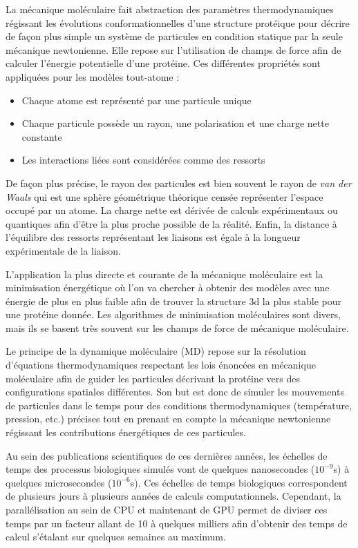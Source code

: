 
La mécanique moléculaire fait abstraction des paramètres thermodynamiques régissant les évolutions conformationnelles d'une structure protéique pour décrire de façon plus simple un système de particules en condition statique par la seule mécanique newtonienne. Elle repose sur l'utilisation de champs de force afin de calculer l'énergie potentielle d'une protéine. Ces différentes propriétés sont appliquées pour les modèles tout-atome :

\begin{itemize}
  \item Chaque atome est représenté par une particule unique
  \item Chaque particule possède un rayon, une polarisation et une charge nette constante
  \item Les interactions liées sont considérées comme des ressorts 
\end{itemize}

De façon plus précise, le rayon des particules est bien souvent le rayon de \textit{van der Waals} qui est une sphère géométrique théorique censée représenter l'espace occupé par un atome. La charge nette est dérivée de calculs expérimentaux ou quantiques afin d'être la plus proche possible de la réalité. Enfin, la distance à l'équilibre des ressorts représentant les liaisons est égale à la longueur expérimentale de la liaison.

L'application la plus directe et courante de la mécanique moléculaire est la minimisation énergétique où l'on va chercher à obtenir des modèles avec une énergie de plus en plus faible afin de trouver la structure 3d la plus stable pour une protéine donnée. Les algorithmes de minimisation moléculaires sont divers, mais ils se basent très souvent sur les champs de force de mécanique moléculaire.


Le principe de la dynamique moléculaire (MD) repose sur la résolution d'équations thermodynamiques respectant les lois énoncées en mécanique moléculaire afin de guider les particules décrivant la protéine vers des configurations spatiales différentes. Son but est donc de simuler les mouvements de particules dans le temps pour des conditions thermodynamiques (température, pression, etc.) précises tout en prenant en compte la mécanique newtonienne régissant les contributions énergétiques de ces particules.

Au sein des publications scientifiques de ces dernières années, les échelles de temps des processus biologiques simulés vont de quelques nanosecondes ($10^{-9}$s) à quelques microsecondes ($10^{-6}$s). Ces échelles de temps biologiques correspondent de plusieurs jours à plusieurs années de calculs computationnels. Cependant, la parallélisation au sein de CPU et maintenant de GPU permet de diviser ces temps par un facteur allant de 10 à quelques milliers afin d'obtenir des temps de calcul s'étalant sur quelques semaines au maximum.

